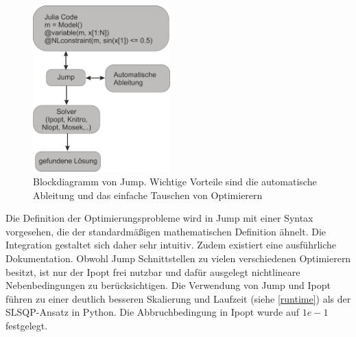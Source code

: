 \documentclass{like}
\begin{document}
\begin{figure}[ht!]
	\centering
	\includegraphics[width=150pt]{Abbildungen/jumpDiagram.png}
	\caption{Blockdiagramm von \ac{Jump}. Wichtige Vorteile sind die automatische Ableitung und das einfache Tauschen von Optimierern}
	\label{fig:jumpDiagram}
\end{figure}

Die Definition der Optimierungsprobleme wird in Jump mit einer Syntax vorgesehen, die der standardmäßigen mathematischen Definition ähnelt. Die Integration gestaltet sich daher sehr intuitiv.  Zudem existiert eine ausführliche Dokumentation.
Obwohl \ac{Jump} Schnittstellen zu vielen verschiedenen Optimierern besitzt, ist nur der \ac{Ipopt} frei nutzbar und dafür ausgelegt nichtlineare Nebenbedingungen zu berücksichtigen. Die Verwendung von \ac{Jump} und \ac{Ipopt} führen zu einer deutlich besseren Skalierung und Laufzeit (siehe \ref{runtime}) als der \ac{SLSQP}-Ansatz in Python. Die Abbruchbedingung in \ac{Ipopt} wurde auf $1e-1$ festgelegt.
\end{document}
